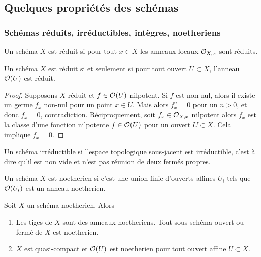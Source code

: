 \subsection{Quelques propriétés des schémas}

\subsubsection{Schémas réduits, irréductibles, intègres, noetheriens}

\begin{defn}
Un schéma $X$ est réduit si pour tout $x\in X$ les anneaux locaux $\mathcal{O}_{X,x}$ sont réduits. 
\end{defn}

\begin{prop}
Un schéma $X$ est réduit si et seulement si pour tout ouvert $U\subset X$, l'anneau $\mathcal{O}(U)$ est réduit.
\end{prop}
\begin{proof}
Supposons $X$ réduit et $f\in \mathcal{O}(U)$ nilpotent. Si $f$ est non-nul, alors il existe un germe $f_x$ non-nul pour un point $x\in U$. Mais alors $f_x^n=0$ pour un $n>0$, et donc $f_x=0$, contradiction.
Réciproquement, soit $f_x\in \mathcal{O}_{X,x}$ nilpotent alors $f_x$ est la classe d'une fonction nilpotente $f\in \mathcal{O}(U)$ pour un ouvert $U\subset X$. Cela implique $f_x=0$.
\end{proof}

\begin{defn}
Un schéma irréductible si l'espace topologique sous-jacent est irréductible, c'est à dire qu'il est non vide et n'est pas réunion de deux fermés propres.
\end{defn}

\begin{defn}
Un schéma $X$ est noetherien si c'est une union finie d'ouverts affines $U_i$ tels que $\mathcal{O}(U_i)$ est un anneau noetherien.
\end{defn}

\begin{prop}
Soit $X$ un schéma noetherien. Alors 
\begin{enumerate}
\item Les tiges de $X$ sont des anneaux noetheriens. Tout sous-schéma ouvert ou fermé de $X$ est noetherien.
\item $X$ est quasi-compact et $\mathcal{O}(U)$ est noetherien pour tout ouvert affine $U\subset X$.
\end{enumerate}
\end{prop}

